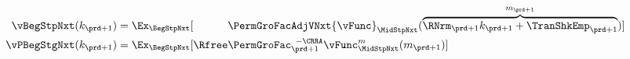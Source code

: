   \begin{equation}\begin{gathered}\begin{aligned}
        \vBegStpNxt(k_{\prd+1})    & = \Ex_{\BegStpNxt}[\phantom{\Rfree}\PermGroFacAdjVNxt{\vFunc}_{\MidStpNxt}(\overbrace{\RNrm_{\prd+1}k_{\prd+1}+{\TranShkEmp}_{\prd+1}}^{m_{\prd+1}})] \label{eq:vFuncBegtpdefn} \\
        \vPBegStgNxt(k_{\prd+1}) & = \Ex_{\BegStpNxt}[\Rfree \PermGroFac_{\prd+1}^{\phantom{1}-\CRRA} \vFunc_{\MidStpNxt}^{m}(m_{\prd+1})]
      \end{aligned}\end{gathered}\end{equation}
